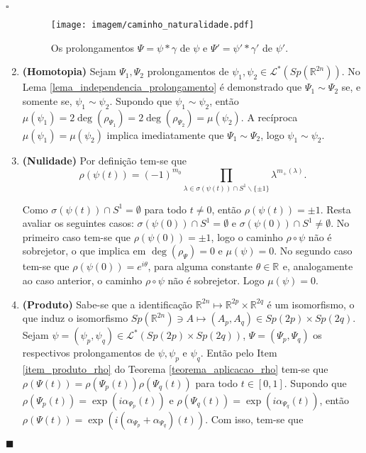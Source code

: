 \documentclass[12pt]{book}
\newenvironment{prova}[1]{$\square$ #1}{\hfill$\blacksquare$}
\newcommand{\caminhosespeciais}[1]{\mathcal{L}^{*}(#1)}
\newcommand{\circulo}{S^{1}}
\newcommand{\complementar}[2]{#1 \backslash #2}
\newcommand{\espectrooperador}[1]{\sigma(#1)}
\newcommand{\gruposimpletico}[1]{Sp(#1)}
\newcommand{\intervalo}{[0,1]}
\newcommand{\real}[1]{\mathbb{R}^{#1}}
\newcommand{\reta}{\real{}}
\begin{document}
\begin{prova}
\begin{enumerate}
			\begin{figure}[!h]
				\centering
				\texttt{[image: imagem/caminho\_naturalidade.pdf]}
				\caption{Os prolongamentos $\Psi=\psi*\gamma$ de $\psi$ e $\Psi'  = \psi'*\gamma'$ de $\psi'$.}
			\end{figure}
			
			\item \textbf{(Homotopia)} Sejam $\Psi_{1}, \Psi_{2}$ prolongamentos de $\psi_{1}, \psi_{2} \in \caminhosespeciais{\gruposimpletico{\real{2n}}}$. No Lema \ref{lema_independencia_prolongamento} é demonstrado que $\Psi_{1}\sim \Psi_{2}$ se, e somente se, $\psi_{1}\sim \psi_{2}$. Supondo que $\psi_{1}\sim \psi_{2}$, então $\mu(\psi_{1}) = 2\deg(\rho_{\Psi_{1}}) = 2\deg(\rho_{\Psi_{2}}) = \mu(\psi_{2})$. A recíproca $\mu(\psi_{1}) = \mu(\psi_{2})$ implica imediatamente que $\Psi_{1}\sim \Psi_{2}$, logo $\psi_{1}\sim \psi_{2}$.
			
			\item \textbf{(Nulidade)} Por definição tem-se que 
			$$
			\rho(\psi(t)) = (-1)^{m_{0}} \prod_{\lambda \in \sigma(\psi(t))\cap \complementar{\circulo}{\{\pm 1 \}  }}\lambda^{m_{+}(\lambda)}.
			$$
			
			Como  $\espectrooperador{\psi(t)}\cap \circulo = \emptyset$ para todo $t\neq 0$, então $	\rho(\psi(t))=\pm 1$. Resta avaliar os seguintes casos: $\espectrooperador{\psi(0)}\cap \circulo = \emptyset$ e $\espectrooperador{\psi(0)}\cap \circulo \neq \emptyset$. No primeiro caso tem-se que $	\rho(\psi(0))=\pm 1$, logo o caminho  $\rho\circ\psi$ não é sobrejetor, o que implica em $\deg(\rho_{\Psi}) = 0$ e $\mu(\psi) = 0$. No segundo caso tem-se que $	\rho(\psi(0))=e^{i\theta}$, para alguma constante $\theta \in \reta$ e, analogamente ao caso anterior, o caminho $\rho\circ\psi$ não é sobrejetor. Logo $\mu(\psi)=0$. 
			
			\item \textbf{(Produto)} Sabe-se que a identificação $\real{2n} \mapsto \real{2p}\times \real{2q}$ é um isomorfismo, o que induz o isomorfismo $\gruposimpletico{\real{2n}} \ni A \mapsto (A_{p}, A_{q}) \in \gruposimpletico{2p} \times \gruposimpletico{2q}$. Sejam $\psi=(\psi_{p}, \psi_{q}) \in \caminhosespeciais{\gruposimpletico{2p}\times \gruposimpletico{2q}}$, $\Psi=(\Psi_{p}, \Psi_{q})$ os respectivos prolongamentos de $\psi, \psi_{p}$ e $\psi_{q}$. Então pelo Item \ref{item_produto_rho} do Teorema \ref{teorema_aplicacao_rho} tem-se que $\rho(\Psi(t))=\rho(\Psi_{p}(t))\rho(\Psi_{q}(t))$ para todo $t\in \intervalo$. Supondo que $\rho(\Psi_{p}(t))=\exp(i\alpha_{\Psi_{p}}(t))$ e $\rho(\Psi_{q}(t))=\exp(i\alpha_{\Psi_{q}}(t))$, então $\rho(\Psi(t)) = \exp(i(\alpha_{\Psi_{p}}+\alpha_{\Psi_{q}})(t))$. Com isso, tem-se que 
			

\end{enumerate}
\end{prova}
\end{document}
